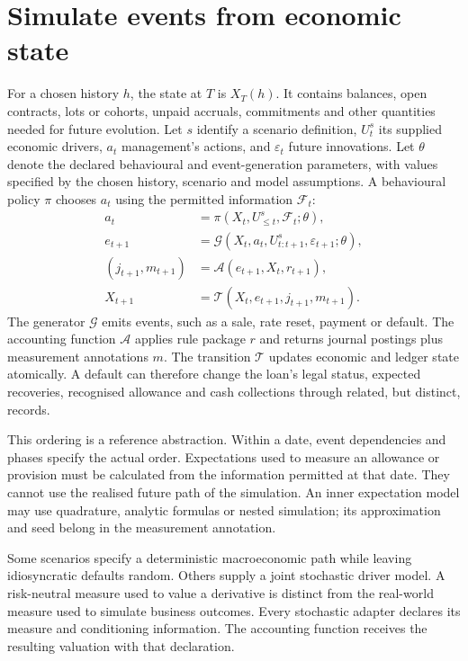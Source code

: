 \section{Simulate events from economic state}

For a chosen history $h$, the state at $T$ is $X_T(h)$. It contains balances,
open contracts, lots or cohorts, unpaid accruals, commitments and other
quantities needed for future evolution. Let $s$ identify a scenario definition,
$U_t^s$ its supplied economic drivers, $a_t$ management's actions, and
$\varepsilon_t$ future innovations. Let $\theta$ denote the declared
behavioural and event-generation parameters, with values specified by the chosen
history, scenario and model assumptions. A behavioural policy $\pi$ chooses
$a_t$ using the permitted information $\mathcal{F}_t$:
\begin{align}
 a_t&=\pi(X_t,U_{\leq t}^s,\mathcal{F}_t;\theta),\label{eq:actions}\\
 e_{t+1}&=\mathcal G(X_t,a_t,U_{t:t+1}^s,\varepsilon_{t+1};\theta),\label{eq:events}\\
 (j_{t+1},m_{t+1})&=\mathcal A(e_{t+1},X_t,r_{t+1}),\label{eq:account}\\
 X_{t+1}&=\mathcal T(X_t,e_{t+1},j_{t+1},m_{t+1}).\label{eq:transition}
\end{align}
The generator $\mathcal G$ emits events, such as a sale, rate reset, payment or default.
The accounting function $\mathcal A$ applies rule package $r$ and returns journal
postings plus measurement annotations $m$. The transition $\mathcal T$ updates economic
and ledger state atomically. A default can therefore change the loan's legal
status, expected recoveries, recognised allowance and cash collections through
related, but distinct, records.

This ordering is a reference abstraction. Within a date, event dependencies
and phases specify the actual order. Expectations used to measure an allowance
or provision must be calculated from the information permitted at that date.
They cannot use the realised future path of the simulation. An inner
expectation model may use quadrature, analytic formulas or nested simulation;
its approximation and seed belong in the measurement annotation.

Some scenarios specify a deterministic macroeconomic path while leaving
idiosyncratic defaults random. Others supply a joint stochastic driver model.
A risk-neutral measure used to value a derivative is distinct from the
real-world measure used to simulate business outcomes. Every stochastic
adapter declares its measure and conditioning information. The accounting
function receives the resulting valuation with that declaration.

